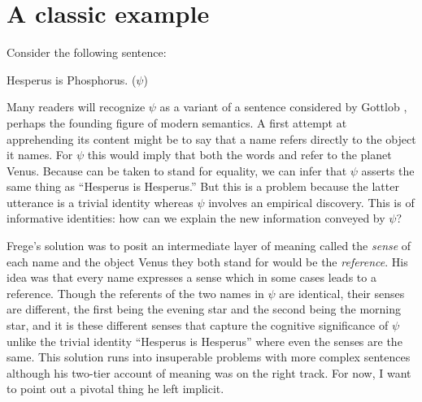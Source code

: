  
\section{A classic example}\label{sec:classic example}

Consider the following sentence:

\begin{exe}
\ex Hesperus is Phosphorus. ($\psi$)\label{ex:1}
\end{exe}

Many readers will recognize $\psi$ as a variant of a sentence considered by Gottlob \citet{frege:sr}, perhaps the founding figure of modern semantics. A first attempt at apprehending its content might be to say that a name refers directly to the object it names. For $\psi$ this would imply that both the words  and  refer to the planet Venus. Because  can be taken to stand for equality, we can infer that $\psi$ asserts the same thing as ``Hesperus is Hesperus.'' But this is a problem because the latter utterance is a trivial identity whereas $\psi$ involves an empirical discovery. This is  of informative identities: how can we explain the new information conveyed by $\psi$?

Frege's solution was to posit an intermediate layer of meaning called the \emph{sense} of each name and the object Venus they both stand for would be the \emph{reference}. His idea was that every name expresses a sense which in some cases leads to a reference. Though the referents of the two names in $\psi$ are identical, their senses are different, the first being the evening star and the second being the morning star, and it is these different senses that capture the cognitive significance of $\psi$ unlike the trivial identity ``Hesperus is Hesperus'' where even the senses are the same. This solution runs into insuperable problems with more complex sentences although his two-tier account of meaning was on the right track. For now, I want to point out a pivotal thing he left implicit.

